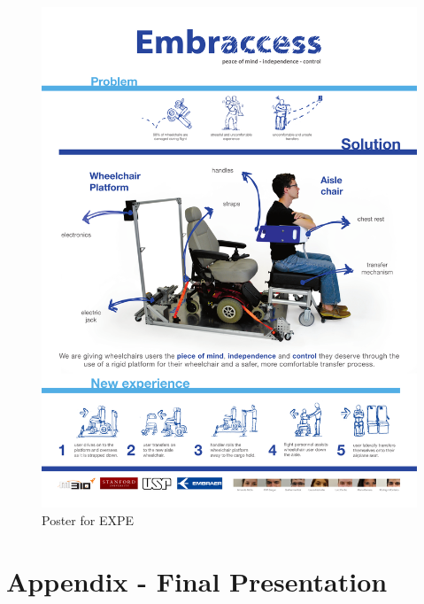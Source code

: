 \begin{figure}[h!]
	\centering
		\includegraphics[width=1\textwidth, page=1]{Figures/Poster.pdf}
		\caption{Poster for EXPE}
		\label{fig:poster}
\end{figure}


\chapter{Appendix - Final Presentation}
\newpage

